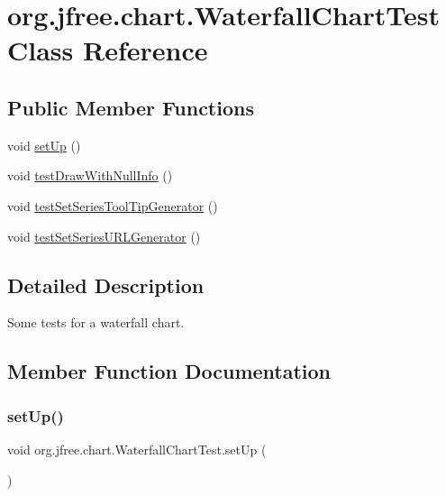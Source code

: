 \hypertarget{classorg_1_1jfree_1_1chart_1_1_waterfall_chart_test}{}\section{org.\+jfree.\+chart.\+Waterfall\+Chart\+Test Class Reference}
\label{classorg_1_1jfree_1_1chart_1_1_waterfall_chart_test}
\subsection*{Public Member Functions}
\begin{DoxyCompactItemize}
\item 
void \mbox{\hyperlink{classorg_1_1jfree_1_1chart_1_1_waterfall_chart_test_a100a9f64ccfe0ae7d875e6e6f01e2175}{set\+Up}} ()
\item 
void \mbox{\hyperlink{classorg_1_1jfree_1_1chart_1_1_waterfall_chart_test_a970b4b3473292f515c860d087621060c}{test\+Draw\+With\+Null\+Info}} ()
\item 
void \mbox{\hyperlink{classorg_1_1jfree_1_1chart_1_1_waterfall_chart_test_a9e8eeea332d010f0736939b19292179b}{test\+Set\+Series\+Tool\+Tip\+Generator}} ()
\item 
void \mbox{\hyperlink{classorg_1_1jfree_1_1chart_1_1_waterfall_chart_test_aa4294ec31da743825c543355994cfaa6}{test\+Set\+Series\+U\+R\+L\+Generator}} ()
\end{DoxyCompactItemize}


\subsection{Detailed Description}
Some tests for a waterfall chart. 

\subsection{Member Function Documentation}
\mbox{\label{classorg_1_1jfree_1_1chart_1_1_waterfall_chart_test_a100a9f64ccfe0ae7d875e6e6f01e2175}} 
\subsubsection{\texorpdfstring{set\+Up()}{setUp()}}
{\footnotesize\ttfamily void org.\+jfree.\+chart.\+Waterfall\+Chart\+Test.\+set\+Up (\begin{DoxyParamCaption}{ }\end{DoxyParamCaption})}

